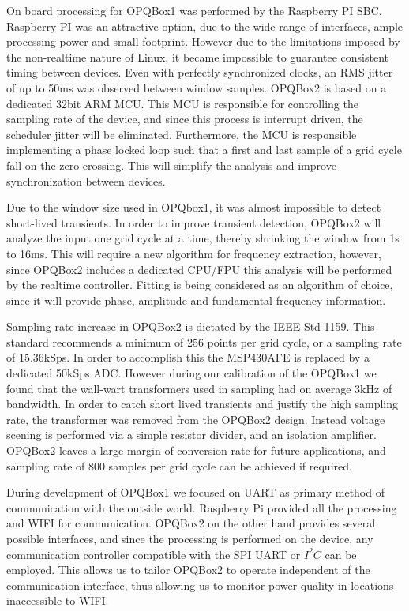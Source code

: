 On board processing for OPQBox1 was performed by the Raspberry PI SBC. Raspberry PI was an attractive option, due to the wide range of interfaces, ample processing power and small
footprint. However due to the limitations imposed by the non-realtime nature of Linux, it became impossible to guarantee consistent timing between devices. Even with perfectly synchronized
clocks, an RMS jitter of up to 50ms was observed between window samples. OPQBox2 is based on a dedicated 32bit ARM MCU. This MCU is responsible for controlling
the sampling rate of the device, and since this process is interrupt driven, the scheduler jitter will be eliminated. Furthermore, the MCU is responsible implementing a 
phase locked loop such that a first and last sample of a grid cycle fall on the zero crossing. This will simplify the analysis and improve synchronization between devices.

Due to the window size used in OPQbox1,  it was almost impossible to detect short-lived transients. In order to improve transient detection, OPQBox2 will analyze the input one grid cycle 
at a time, thereby shrinking the window from 1s to 16ms. This will require a new algorithm for frequency extraction, however, since OPQBox2 includes a dedicated CPU/FPU this analysis will be performed by the realtime controller. Fitting is being considered as an algorithm of choice, since it will provide phase, amplitude and fundamental frequency information.

Sampling rate increase in OPQBox2 is dictated by the IEEE Std 1159.\cite{ieee_pq} This standard recommends a minimum of 256 points per grid cycle, or a sampling rate of 15.36kSps. In order to accomplish this
the MSP430AFE is replaced by a dedicated 50kSps ADC. However during our calibration of the OPQBox1 we found that the wall-wart transformers used in sampling had on average 3kHz of bandwidth.
In order to catch short lived transients and justify the high sampling rate, the transformer was removed from the OPQBox2 design. Instead voltage scening is performed via a simple resistor
divider, and an isolation amplifier. OPQBox2 leaves a large margin of conversion rate for future applications, and sampling rate of 800 samples per grid cycle can be achieved if required.

During development of OPQBox1 we focused on UART as primary method of communication with the outside world. Raspberry Pi provided all the processing and WIFI for communication. OPQBox2 on the other hand provides several possible interfaces, and since the processing is performed on the device, any communication controller compatible with the SPI UART or $I^2C$
can be employed. This allows us to tailor OPQBox2 to operate independent of the communication interface, thus allowing us to monitor power quality in locations inaccessible to WIFI.

